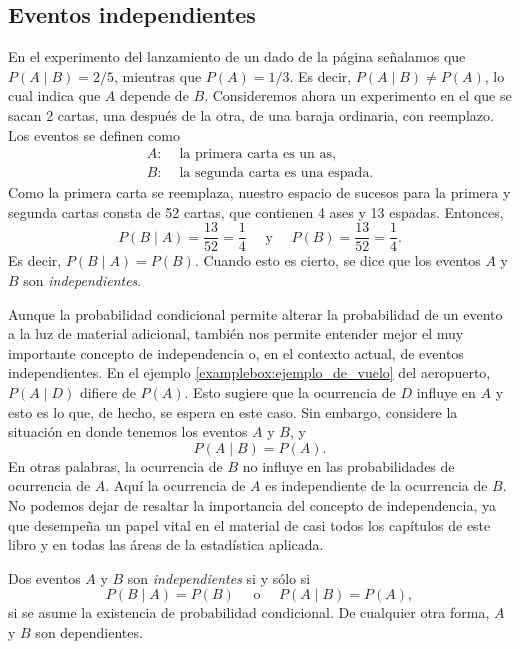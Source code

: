 \newpage

\subsection*{Eventos independientes}

En el experimento del lanzamiento de un dado de la página \pageref{pagdeeventodados} señalamos que $P(A \mid B) = 2/5$, mientras que $P(A) = 1/3$. Es decir, $P(A \mid B) \neq P(A)$, lo cual indica que $A$ depende de $B$. Consideremos ahora un experimento en el que se sacan 2 cartas, una después de la otra, de una baraja ordinaria, con reemplazo. Los eventos se definen como
\begin{align*}
    A: & \text{ la primera carta es un as,} \\
    B: & \text{ la segunda carta es una espada.}
\end{align*}
Como la primera carta se reemplaza, nuestro espacio de sucesos para la primera y segunda
cartas consta de 52 cartas, que contienen 4 ases y 13 espadas. Entonces,
$$P(B \mid A) = \frac{13}{52} = \frac{1}{4} \quad \text{ y } \quad P(B) = \frac{13}{52} = \frac{1}{4}.$$
Es decir, $P(B \mid A) = P(B)$. Cuando esto es cierto, se dice que los eventos $A$ y $B$ son \emph{independientes}.

Aunque la probabilidad condicional permite alterar la probabilidad de un evento a la luz de material adicional, también nos permite entender mejor el muy importante concepto de independencia o, en el contexto actual, de eventos independientes. En el ejemplo \ref{examplebox:ejemplo_de_vuelo} del aeropuerto, $P(A \mid D)$ difiere de $P(A)$. Esto sugiere que la ocurrencia de $D$ influye en $A$ y esto es lo que, de hecho, se espera en este caso. Sin embargo, considere la situación en donde tenemos los eventos $A$ y $B$, y
$$P(A \mid B) = P(A).$$
En otras palabras, la ocurrencia de $B$ no influye en las probabilidades de ocurrencia de $A$. Aquí la ocurrencia de $A$ es independiente de la ocurrencia de $B$. No podemos dejar de resaltar la importancia del concepto de independencia, ya que desempeña un papel vital en el material de casi todos los capítulos de este libro y en todas las áreas de la estadística aplicada.

\begin{definicion}{}{}
    Dos eventos $A$ y $B$ son \emph{independientes} si y sólo si
    $$P(B \mid A) = P(B) \quad \text{ o } \quad P(A \mid B) = P(A),$$
    si se asume la existencia de probabilidad condicional. De cualquier otra forma, $A$ y $B$ son dependientes.
\end{definicion}

